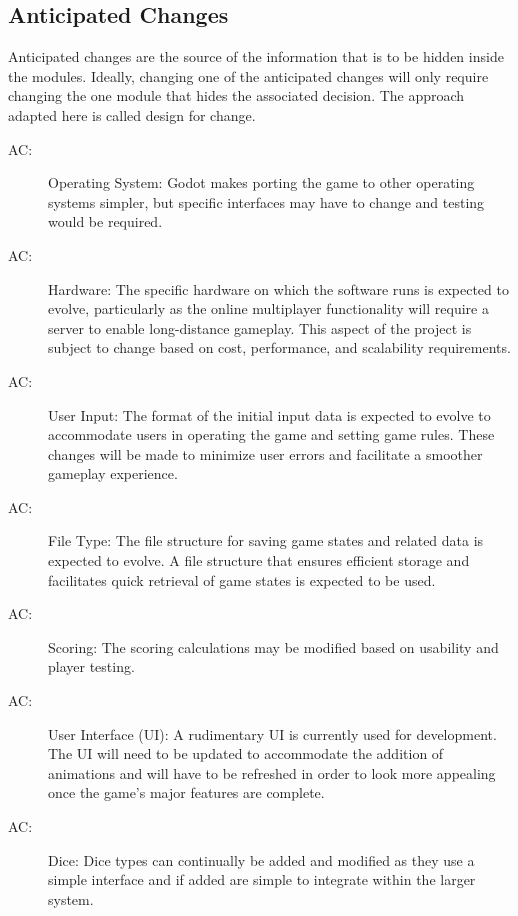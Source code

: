 \documentclass[12pt, titlepage]{article}
\newcounter{acnum}
\newcommand{\actheacnum}{AC\theacnum}
\begin{document}
\subsection{Anticipated Changes} \label{SecAchange}

Anticipated changes are the source of the information that is to be hidden
inside the modules. Ideally, changing one of the anticipated changes will only
require changing the one module that hides the associated decision. The approach
adapted here is called design for
change.

\begin{description}
\item[ \actheacnum \label{acOS}:] Operating System: Godot makes porting the game to other operating systems simpler, but specific interfaces may have to change and testing would be required.
\item[ \actheacnum \label{acHardware}:] Hardware: The specific hardware on which the software runs is expected to evolve, particularly as the online multiplayer functionality will require a server to enable long-distance gameplay. This aspect of the project is subject to change based on cost, performance, and scalability requirements.
\item[ \actheacnum \label{acUserInput}:] User Input: The format of the initial input data is expected to evolve to accommodate users in operating the game and setting game rules. These changes will be made to minimize user errors and facilitate a smoother gameplay experience.
\item[ \actheacnum \label{acFileType}:] File Type: The file structure for saving game states and related data is expected to evolve. A file structure that ensures efficient storage and facilitates quick retrieval of game states is expected to be used. 
\item[ \actheacnum \label{acScoring}:] Scoring: The scoring calculations may be modified based on usability and player testing.
\item[ \actheacnum \label{acUI}:] User Interface (UI): A rudimentary UI is currently used for development. The UI will need to be updated to accommodate the addition of animations and will have to be refreshed in order to look more appealing once the game's major features are complete.
\item[ \actheacnum \label{acDice}:] Dice: Dice types can continually be added and modified as they use a simple interface and if added are simple to integrate within the larger system.
\end{description}
\end{document}
